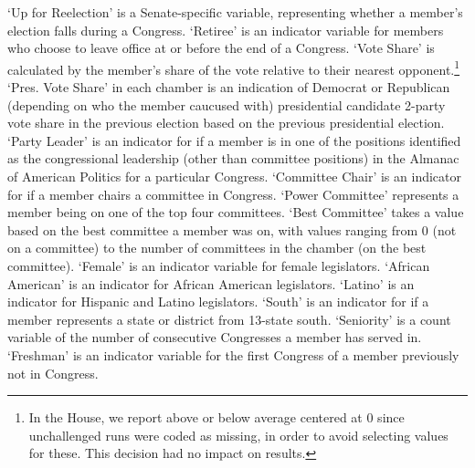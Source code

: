 \documentclass[12pt]{article}
\begin{document}
`Up for Reelection' is a Senate-specific variable, representing whether a member's election falls during a Congress. `Retiree' is an indicator variable for members who choose to leave office at or before the end of a Congress. `Vote Share' is calculated by the member's share of the vote relative to their nearest opponent.\footnote{In the House, we report above or below average centered at 0 since unchallenged runs were coded as missing, in order to avoid selecting values for these. This decision had no impact on results.}  `Pres. Vote Share' in each chamber is an indication of Democrat or Republican (depending on who the member caucused with) presidential candidate 2-party vote share in the previous election based on the previous presidential election.  `Party Leader' is an indicator for if a member is in one of the positions identified as the congressional leadership (other than committee positions) in the Almanac of American Politics for a particular Congress. `Committee Chair' is an indicator for if a member chairs a committee in Congress. `Power Committee' represents a member being on one of the top four committees.  `Best Committee' takes a value based on the best committee a member was on, with values ranging from 0 (not on a committee) to the number of committees in the chamber (on the best committee). `Female' is an indicator variable for female legislators. `African American' is an indicator for African American legislators. `Latino' is an indicator for Hispanic and Latino legislators. `South' is an indicator for if a member represents a state or district from 13-state south. `Seniority' is a count variable of the number of consecutive Congresses a member has served in. `Freshman' is an indicator variable for the first Congress of a member previously not in Congress. 
\end{document}
